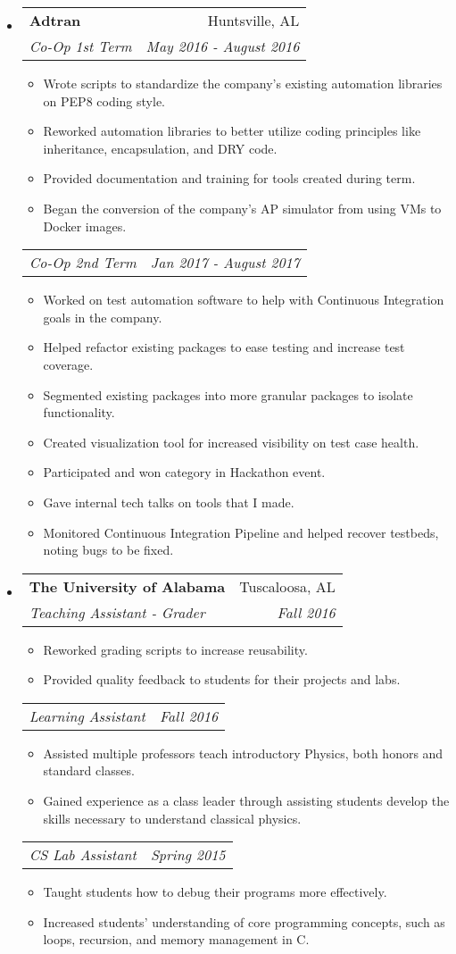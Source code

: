 \documentclass[letterpaper,10pt]{article}
\makeatletter
\newcommand{\resitem}[1]{\item #1 \vspace{-2pt}}
\newcommand{\ressubheading}[4]{
    \begin{tabular*}{6.5in}{l@{\cftdotfill{\cftsecdotsep}\extracolsep{\fill}}r}
      \textbf{#1} & #2 \\
      \textit{#3} & \textit{#4} \\
  \end{tabular*}\vspace{-6pt}}
\newcommand{\secondsubheading}[2]{
    \begin{tabular*}{6.5in}{l@{\cftdotfill{\cftsecdotsep}\extracolsep{\fill}}r}
      \textit{#1} & \textit{#2} \\
  \end{tabular*}\vspace{-6pt}}
\makeatother
\begin{document}
  \begin{itemize}

    \item
      \ressubheading{Adtran}{Huntsville, AL}{Co-Op 1st Term}{May 2016 - August 2016}
      \begin{itemize}
          \resitem{Wrote scripts to standardize the company's existing automation libraries on PEP8 coding style.}
          \resitem{Reworked automation libraries to better utilize coding principles like inheritance, encapsulation, and DRY code.}
          \resitem{Provided documentation and training for tools created during term.}
          \resitem{Began the conversion of the company's AP simulator from using VMs to Docker images.}
      \end{itemize}
      \secondsubheading{Co-Op 2nd Term}{Jan 2017 - August 2017}
      \begin{itemize}
              \resitem{Worked on test automation software to help with Continuous Integration goals in the company.}
              \resitem{Helped refactor existing packages to ease testing and increase test coverage.}
              \resitem{Segmented existing packages into more granular packages to isolate functionality.}
              \resitem{Created visualization tool for increased visibility on test case health.}
              \resitem{Participated and won category in Hackathon event.}
              \resitem{Gave internal tech talks on tools that I made.}
              \resitem{Monitored Continuous Integration Pipeline and helped recover testbeds, noting bugs to be fixed.}
      \end{itemize}

    \item
      \ressubheading{The University of Alabama}{Tuscaloosa, AL}{Teaching Assistant - Grader}{Fall 2016}
      \begin{itemize}
          \resitem{Reworked grading scripts to increase reusability.}
          \resitem{Provided quality feedback to students for their projects and labs.}
      \end{itemize}

      \secondsubheading{Learning Assistant}{Fall 2016}
      \begin{itemize}
          \resitem{Assisted multiple professors teach introductory Physics, both honors and standard classes.}
          \resitem{Gained experience as a class leader through assisting students develop the skills necessary to understand classical physics.}
      \end{itemize}

      \secondsubheading{CS Lab Assistant}{Spring 2015}
      \begin{itemize}
          \resitem{Taught students how to debug their programs more effectively.}
          \resitem{Increased students' understanding of core programming concepts, such as loops, recursion, and memory management in C.}
      \end{itemize}

  \end{itemize}
\end{document}

